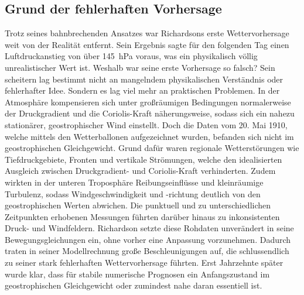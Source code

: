 \subsection{Grund der fehlerhaften Vorhersage \label{geostrophisch:subsection:failedPrediction}}

Trotz seines bahnbrechenden Ansatzes war Richardsons erste Wettervorhersage weit von der Realität entfernt. 
Sein Ergebnis sagte für den folgenden Tag einen Luftdruckanstieg von über \SI{145}{\hecto\pascal} voraus, was ein physikalisch völlig unrealistischer Wert ist. 
Weshalb war seine erste Vorhersage so falsch? 
Sein scheitern lag bestimmt nicht an mangelndem physikalischen Verständnis oder fehlerhafter Idee. 
Sondern es lag viel mehr an praktischen Problemen.
In der Atmosphäre kompensieren sich unter großräumigen Bedingungen normalerweise der Druckgradient und die Coriolis-Kraft näherungsweise, sodass sich ein nahezu stationärer, geostrophischer Wind einstellt.
Doch die Daten vom 20. Mai 1910, welche mittels den Wetterballonen aufgezeichnet wurden, befanden sich nicht im geostrophischen Gleichgewicht.
Grund dafür waren regionale Wetterstörungen wie Tiefdruckgebiete, Fronten und vertikale Strömungen, welche den idealisierten Ausgleich zwischen Druckgradient- und Coriolis-Kraft verhinderten.
Zudem wirkten in der unteren Troposphäre Reibungseinflüsse und kleinräumige Turbulenz, sodass Windgeschwindigkeit und -richtung deutlich von den geostrophischen Werten abwichen.
Die punktuell und zu unterschiedlichen Zeitpunkten erhobenen Messungen führten darüber hinaus zu inkonsistenten Druck- und Windfeldern.
Richardson setzte diese Rohdaten unverändert in seine Bewegungsgleichungen ein, ohne vorher eine Anpassung vorzunehmen.
Dadurch traten in seiner Modellrechnung große Beschleunigungen auf, die schlussendlich zu seiner stark fehlerhaften Wettervorhersage führten.
Erst Jahrzehnte später wurde klar, dass für stabile numerische Prognosen ein Anfangszustand im geostrophischen Gleichgewicht oder zumindest nahe daran essentiell ist.


 



